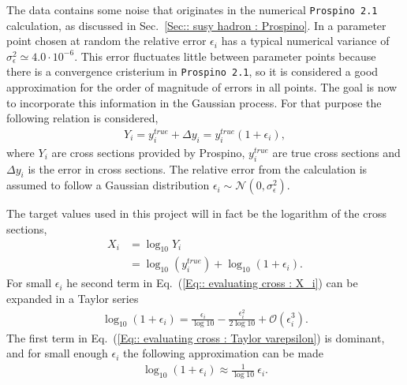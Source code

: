 \documentclass[twoside,english]{uiofysmaster}
\begin{document}
{The data contains some noise that originates in the numerical \verb|Prospino 2.1| calculation, as discussed in Sec.~\ref{Sec:: susy hadron : Prospino}. In a parameter point chosen at random the relative error $\epsilon_i$ has a typical numerical variance of $\sigma^2_{\epsilon} \simeq 4.0 \cdot 10^{-6}$. This error fluctuates little between parameter points because there is a convergence cristerium in \verb|Prospino 2.1|, so it is considered a good approximation for the order of magnitude of errors in all points. The goal is now to incorporate this information in the Gaussian process. For that purpose the following relation is considered,
\begin{align}\label{Eq:: cross section w/ error}
Y_i = y^{true}_i + \Delta y_i = y_i^{true}(1 + \epsilon_i),
\end{align}
where $Y_i$ are cross sections provided by Prospino, $y_i^{true}$ are true cross sections and $\Delta y_i$ is the error in cross sections. The relative error from the calculation is assumed to follow a Gaussian distribution $\epsilon_i \sim \mathcal{N}(0, \sigma_{\epsilon}^2)$. 

The target values used in this project will in fact be the logarithm of the cross sections, 
\begin{align}
X_i &= \log_{10} Y_i \nonumber \\
&= \log_{10}(y_i^{true})  + \log_{10}(1 + \epsilon_i).\label{Eq:: evaluating cross : X_i}
\end{align}
For small $\epsilon_i$ he second term in Eq.~(\ref{Eq:: evaluating cross : X_i}) can be expanded in a Taylor series
\begin{align}\label{Eq:: evaluating cross : Taylor varepsilon}
\log_{10}(1 + \epsilon_i) = \frac{\epsilon_i}{\log 10} - \frac{\epsilon_i^2}{2 \log 10} + \mathcal{O}(\epsilon_i^3). 
\end{align} 
The first term in Eq.~(\ref{Eq:: evaluating cross : Taylor varepsilon}) is dominant, and for small enough $\epsilon_i$ the following approximation can be made
\begin{align}
\log_{10}(1 + \epsilon_i) \approx \frac{1}{\log 10} ~\epsilon_i.
\end{align}

}
\end{document}
